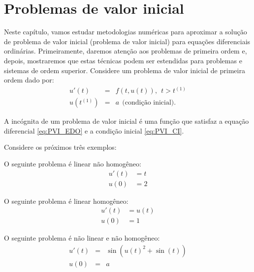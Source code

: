 
%

\chapter{Problemas de valor inicial}
Neste capítulo, vamos estudar metodologias numéricas para aproximar a solução de problema de valor inicial (problema de valor inicial) para equações diferenciais ordinárias. Primeiramente, daremos atenção aos problemas de primeira ordem e, depois, mostraremos que estas técnicas podem ser estendidas para problemas e sistemas de ordem superior. Considere um problema de valor inicial de primeira ordem dado por:
\begin{subequations}\label{eq:PVI}
\begin{eqnarray}
  u'(t) &=& f(t, u(t)),~~t>t^{(1)}\label{eq:PVI_EDO}\\
  u(t^{(1)}) &=& a ~~ \text{(condição inicial)}.\label{eq:PVI_CI}
\end{eqnarray}
\end{subequations}

A incógnita de um problema de valor inicial é uma função que satisfaz a equação diferencial \eqref{eq:PVI_EDO} e a condição inicial \eqref{eq:PVI_CI}.

Considere os próximos três exemplos:
\begin{ex} O seguinte problema é linear não homogêneo:
\begin{equation}
\begin{split}
    u'(t) &=t\\
   u(0) &= 2
   \end{split}
   \end{equation}
\end{ex}

\begin{ex} O seguinte problema é linear homogêneo:
\begin{eqnarray}
   u'(t) &=u(t)\\
            u(0) &= 1
\end{eqnarray}
\end{ex}

\begin{ex} O seguinte problema é não linear e não homogêneo:
\begin{eqnarray}
   u'(t) &=&\sin(u(t)^2+\sin(t))\\
            u(0) &=& a
\end{eqnarray}
\end{ex}

